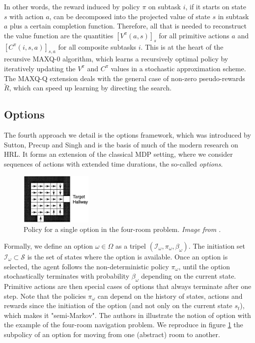 \documentclass{article}
\begin{document}
In other words, the reward induced by policy $\pi$ on subtask $i$, if it starts on state $s$ with action $a$, can be decomposed into the projected value of state $s$ in subtask $a$ plus a certain completion function.
Therefore, all that is needed to reconstruct the value function are the quantities $[V^{\pi}(a, s)]_s$ for all primitive actions $a$ and $[C^{\pi}(i, s, a)]_{s, a}$ for all composite subtasks $i$. This is at the heart of the recursive MAXQ-0 algorithm, which learns a recursively optimal policy by iteratively updating the $V^{\pi}$ and $C^{\pi}$ values in a stochastic approximation scheme. The MAXQ-Q extension deals with the general case of non-zero pseudo-rewards $\tilde{R}$, which can speed up learning by directing the search.

\subsection{Options}

The fourth approach we detail is the options framework, which was introduced by Sutton, Precup and Singh \cite{sutton_between_1999} and is the basis of much of the modern research on HRL. It forms an extension of the classical MDP setting, where we consider sequences of actions with extended time durations, the so-called \textit{options}.

\begin{figure}
    \centering
    \includegraphics[width=3.5cm]{images/single_option.png}
    \caption{Policy for a single option in the four-room problem. \small \it Image from \cite{sutton_between_1999}.}
    \label{fig:single-option}
\end{figure}

Formally, we define an option $\omega \in \Omega$ as a tripel $(\mathcal{I}_\omega, \pi_\omega, \beta_\omega)$. The initiation set $\mathcal{I}_\omega \subset \mathcal{S}$ is the set of states where the option is available. Once an option is selected, the agent follows the non-deterministic policy $\pi_\omega$, until the option stochastically terminates with probability $\beta_\omega$ depending on the current state. Primitive actions are then special cases of options that always terminate after one step. Note that the policies $\pi_\omega$ can  depend on the history of states, actions and rewards since the initiation of the option (and not only on the current state $s_t$), which makes it "semi-Markov". The authors in \cite{sutton_between_1999} illustrate the notion of option with the example of the four-room navigation problem. We reproduce in figure \ref{fig:single-option} the subpolicy of an option for moving from one (abstract) room to another.
\end{document}
